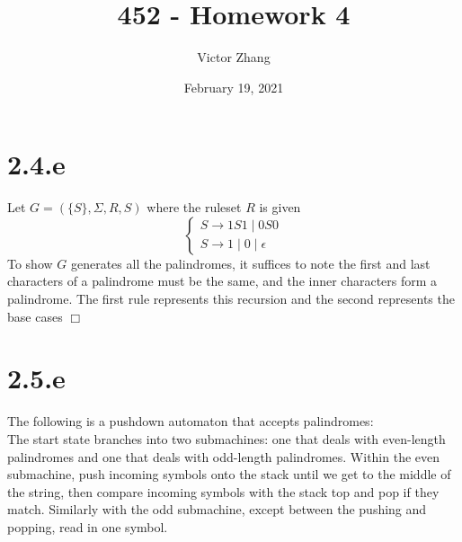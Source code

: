 \documentclass{article}
\title{452 - Homework 4}
\author{Victor Zhang}
\date{February 19, 2021}
\begin{document}
\maketitle

\section*{2.4.e}
Let $G = (\{S\},\Sigma,R,S)$ where the ruleset $R$ is given
\begin{equation*}
\begin{cases}
S \to 1S1 \;\vert\; 0S0\\
S \to 1 \;\vert\; 0 \;\vert\; \epsilon
\end{cases}
\end{equation*}
To show $G$ generates all the palindromes, it suffices to note the first and last characters of a palindrome must be the same, and the inner characters form a palindrome. The first rule represents this recursion and the second represents the base cases $\Box$

\section*{2.5.e}
The following is a pushdown automaton that accepts palindromes:\\
The start state branches into two submachines: one that deals with even-length palindromes and one that deals with odd-length palindromes. Within the even submachine, push incoming symbols onto the stack until we get to the middle of the string, then compare incoming symbols with the stack top and pop if they match. Similarly with the odd submachine, except between the pushing and popping, read in one  symbol.
\end{document}
